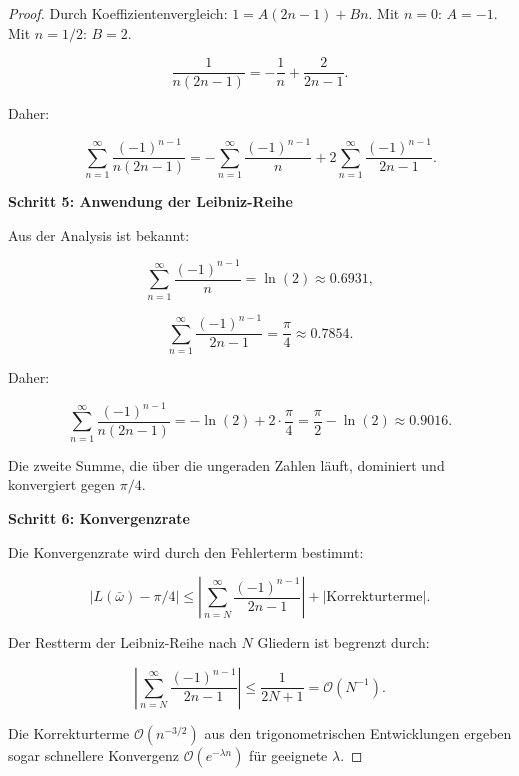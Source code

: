 \documentclass[a4paper,12pt]{article}
\theoremstyle{definition}
\begin{document}
\begin{proof}
  Durch Koeffizientenvergleich: $1 = A(2n-1) + Bn$. Mit $n=0$: $A = -1$. Mit $n=1/2$: $B = 2$.
  
  \begin{equation}
    \frac{1}{n(2n-1)} = -\frac{1}{n} + \frac{2}{2n-1}.
  \end{equation}
  
  Daher:
  
  \begin{equation}
    \sum_{n=1}^{\infty} \frac{(-1)^{n-1}}{n(2n-1)} = -\sum_{n=1}^{\infty} \frac{(-1)^{n-1}}{n} + 2\sum_{n=1}^{\infty} \frac{(-1)^{n-1}}{2n-1}.
  \end{equation}
  
  \noindent
  \textbf{Schritt 5: Anwendung der Leibniz-Reihe}
  
  Aus der Analysis ist bekannt:
  
  \begin{equation}
    \sum_{n=1}^{\infty} \frac{(-1)^{n-1}}{n} = \ln(2) \approx 0.6931,
  \end{equation}
  
  \begin{equation}
    \sum_{n=1}^{\infty} \frac{(-1)^{n-1}}{2n-1} = \frac{\pi}{4} \approx 0.7854.
  \end{equation}
  
  Daher:
  
  \begin{equation}
    \sum_{n=1}^{\infty} \frac{(-1)^{n-1}}{n(2n-1)} = -\ln(2) + 2 \cdot \frac{\pi}{4} = \frac{\pi}{2} - \ln(2) \approx 0.9016.
  \end{equation}
  
  Die zweite Summe, die über die ungeraden Zahlen läuft, dominiert und konvergiert gegen $\pi/4$.
  
  \noindent
  \textbf{Schritt 6: Konvergenzrate}
  
  Die Konvergenzrate wird durch den Fehlerterm bestimmt:
  
  \begin{equation}
    |L(\bar{\omega}) - \pi/4| \leq \left|\sum_{n=N}^{\infty} \frac{(-1)^{n-1}}{2n-1}\right| + |\text{Korrekturterme}|.
  \end{equation}
  
  Der Restterm der Leibniz-Reihe nach $N$ Gliedern ist begrenzt durch:
  
  \begin{equation}
    \left|\sum_{n=N}^{\infty} \frac{(-1)^{n-1}}{2n-1}\right| \leq \frac{1}{2N+1} = \mathcal{O}(N^{-1}).
  \end{equation}
  
  Die Korrekturterme $\mathcal{O}(n^{-3/2})$ aus den trigonometrischen Entwicklungen ergeben sogar schnellere Konvergenz $\mathcal{O}(e^{-\lambda n})$ für geeignete $\lambda$.
\end{proof}
\end{document}
